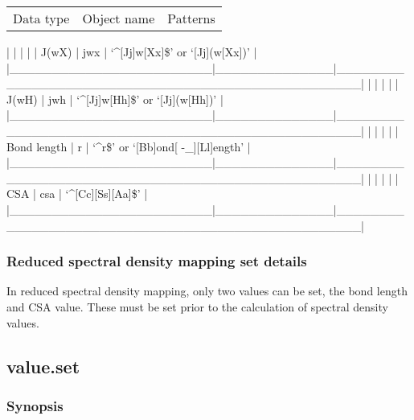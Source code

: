 \begin{tabular}{ccc}
Data type & Object name & Patterns \\
\end{tabular}
|                        |              |                                                  |
| J(wX)                  | jwx          | `\^{}[Jj]w[Xx]\$' or `[Jj](w[Xx])'                   |
|\_\_\_\_\_\_\_\_\_\_\_\_\_\_\_\_\_\_\_\_\_\_\_\_|\_\_\_\_\_\_\_\_\_\_\_\_\_\_|\_\_\_\_\_\_\_\_\_\_\_\_\_\_\_\_\_\_\_\_\_\_\_\_\_\_\_\_\_\_\_\_\_\_\_\_\_\_\_\_\_\_\_\_\_\_\_\_\_\_|
|                        |              |                                                  |
| J(wH)                  | jwh          | `\^{}[Jj]w[Hh]\$' or `[Jj](w[Hh])'                   |
|\_\_\_\_\_\_\_\_\_\_\_\_\_\_\_\_\_\_\_\_\_\_\_\_|\_\_\_\_\_\_\_\_\_\_\_\_\_\_|\_\_\_\_\_\_\_\_\_\_\_\_\_\_\_\_\_\_\_\_\_\_\_\_\_\_\_\_\_\_\_\_\_\_\_\_\_\_\_\_\_\_\_\_\_\_\_\_\_\_|
|                        |              |                                                  |
| Bond length            | r            | `\^{}r\$' or `[Bb]ond[ -\_][Ll]ength'                 |
|\_\_\_\_\_\_\_\_\_\_\_\_\_\_\_\_\_\_\_\_\_\_\_\_|\_\_\_\_\_\_\_\_\_\_\_\_\_\_|\_\_\_\_\_\_\_\_\_\_\_\_\_\_\_\_\_\_\_\_\_\_\_\_\_\_\_\_\_\_\_\_\_\_\_\_\_\_\_\_\_\_\_\_\_\_\_\_\_\_|
|                        |              |                                                  |
| CSA                    | csa          | `\^{}[Cc][Ss][Aa]\$'                                 |
|\_\_\_\_\_\_\_\_\_\_\_\_\_\_\_\_\_\_\_\_\_\_\_\_|\_\_\_\_\_\_\_\_\_\_\_\_\_\_|\_\_\_\_\_\_\_\_\_\_\_\_\_\_\_\_\_\_\_\_\_\_\_\_\_\_\_\_\_\_\_\_\_\_\_\_\_\_\_\_\_\_\_\_\_\_\_\_\_\_|



\subsubsection{Reduced spectral density mapping set details}

In reduced spectral density mapping, only two values can be set, the bond length and CSA
value.  These must be set prior to the calculation of spectral density values.


\newpage

\subsection{value.set}


\subsubsection{Synopsis}

